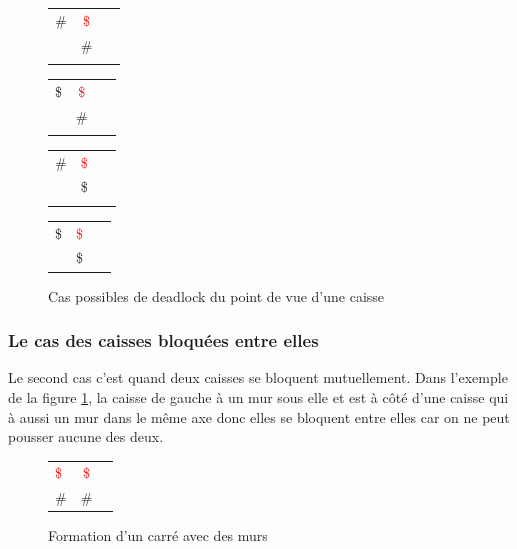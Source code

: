 \documentclass[a4paper,12pt]{article} %
\begin{document}
\begin{figure}[!h]
\centering
\begin{tabular}{ l c r }
\# & \textcolor{red}{\$} & \ \\
\  &      \#             & \ \\
\\
\hline
\end{tabular}

\begin{tabular}{ l c r }\\
\$ & \textcolor{red}{\$} & \ \\
\  &      \#             & \ \\
\\
\hline
\end{tabular}

\begin{tabular}{ l c r }\\
\# & \textcolor{red}{\$} & \ \\
\  &      \$             & \ \\
\\
\hline
\end{tabular}

\begin{tabular}{ l c r }\\
\$  &   \textcolor{red}{\$}  & \ \\
\   &        \$              & \ \\
\end{tabular}

\caption{Cas possibles de deadlock du point de vue d'une caisse}
\end{figure}

\subsubsection{Le cas des caisses bloquées entre elles}
\label{cBetween}

Le second cas c'est quand deux caisses se bloquent mutuellement. Dans l'exemple de la figure \ref{DL2}, la caisse de gauche à un mur sous elle et est à côté d'une caisse qui à aussi un mur dans le même axe donc elles se bloquent entre elles car on ne peut pousser aucune des deux.

\begin{figure}[!h]
\centering
\begin{tabular}{ l c r }
\textcolor{red}{\$} & \textcolor{red}{\$} \\
\#                  &     \#              \\
\end{tabular}
\caption{Formation d'un carré avec des murs}
\label{DL2}
\end{figure}
\end{document}
